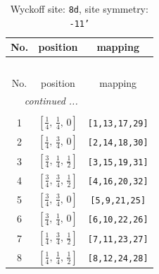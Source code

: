 \documentclass[fleqn,8pt]{jsarticle}
\begin{document}
\begin{longtable}{ccc}
\caption{Wyckoff site: {\tt 8d}, site symmetry: {\tt -11'}}
 \\
 \hline \hline
No. & position & mapping \\ \hline \endfirsthead

\multicolumn{2}{l}{\tablename\ \thetable{}} \\
 \hline \hline
No. & position & mapping \\ \hline \endhead

 \hline \hline
\multicolumn{2}{r}{\footnotesize\it continued ...} \\ \endfoot

 \hline \hline
\multicolumn{2}{r}{} \\ \endlastfoot

1 & $\left[ \frac{1}{4},\, \frac{1}{4},\, 0 \right]$ & {\tt [1,13,17,29]} \\ \hline
2 & $\left[ \frac{1}{4},\, \frac{3}{4},\, 0 \right]$ & {\tt [2,14,18,30]} \\ \hline
3 & $\left[ \frac{3}{4},\, \frac{1}{4},\, \frac{1}{2} \right]$ & {\tt [3,15,19,31]} \\ \hline
4 & $\left[ \frac{3}{4},\, \frac{3}{4},\, \frac{1}{2} \right]$ & {\tt [4,16,20,32]} \\ \hline
5 & $\left[ \frac{3}{4},\, \frac{3}{4},\, 0 \right]$ & {\tt [5,9,21,25]} \\ \hline
6 & $\left[ \frac{3}{4},\, \frac{1}{4},\, 0 \right]$ & {\tt [6,10,22,26]} \\ \hline
7 & $\left[ \frac{1}{4},\, \frac{3}{4},\, \frac{1}{2} \right]$ & {\tt [7,11,23,27]} \\ \hline
8 & $\left[ \frac{1}{4},\, \frac{1}{4},\, \frac{1}{2} \right]$ & {\tt [8,12,24,28]} \\
\end{longtable}
\renewcommand{\arraystretch}{1.2}
\end{document}
